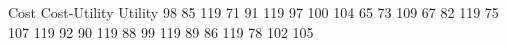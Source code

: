 Cost   Cost-Utility	Utility
98     85		119
71     91 		119
97     100 		104
65     73               109
67     82               119  
75     107              119     
92     90               119     
88     99               119    
89     86               119
78     102              105



